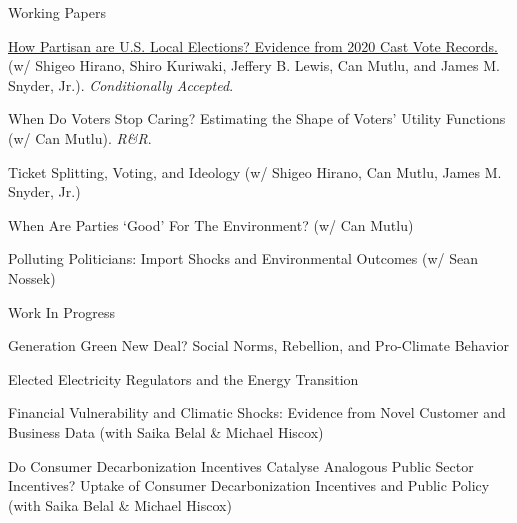 \documentclass{resume}
\begin{document}
\begin{rSection}{\Large W\MakeLowercase{orking} P\MakeLowercase{apers}} \itemsep -3pt {}
\vspace{-0.7cm}

 
\item \href{https://osf.io/preprints/osf/db3mj}{How Partisan are U.S. Local Elections? Evidence from 2020 Cast Vote Records.} (w/ Shigeo Hirano, Shiro Kuriwaki, Jeffery B. Lewis, Can Mutlu, and James M. Snyder, Jr.). \textit{Conditionally Accepted}.

\medskip

\item When Do Voters Stop Caring? Estimating the Shape of Voters' Utility Functions (w/ Can Mutlu). \textit{R\&R}.

\medskip

\item Ticket Splitting, Voting, and Ideology (w/ Shigeo Hirano, Can Mutlu, James M. Snyder, Jr.)

\medskip 

\item When Are Parties `Good' For The Environment?  (w/ Can Mutlu)


\medskip

\item Polluting Politicians: Import Shocks and Environmental Outcomes (w/ Sean Nossek)

\end{rSection}

\bigskip


\begin{rSection}{\Large W\MakeLowercase{ork} I\MakeLowercase{n} P\MakeLowercase{rogress}} \itemsep -2pt {}
\vspace{-0.7cm}


\item Generation Green New Deal? Social Norms, Rebellion, and Pro-Climate Behavior

\medskip

\item Elected Electricity Regulators and the
Energy Transition

\medskip


\item Financial Vulnerability and Climatic Shocks: Evidence from Novel Customer and Business Data (with Saika Belal \& Michael Hiscox)

\medskip
\item Do Consumer Decarbonization Incentives Catalyse Analogous Public Sector Incentives? Uptake of Consumer Decarbonization Incentives and Public Policy (with Saika Belal \& Michael Hiscox)

\end{rSection}
\end{document}
